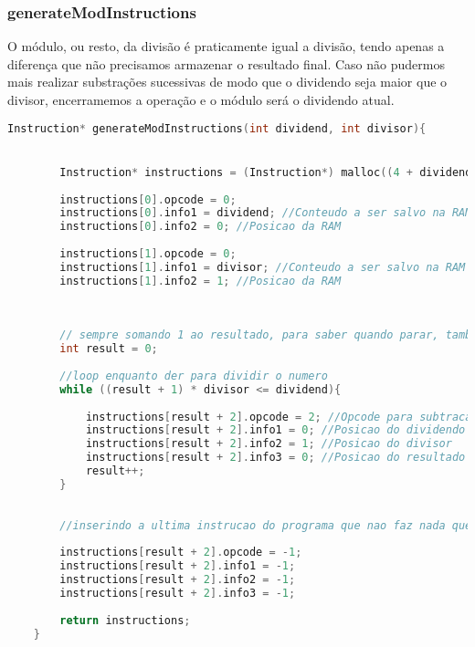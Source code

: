 \documentclass{article}
\begin{document}
\subsubsection{generateModInstructions}

O módulo, ou resto, da divisão é praticamente igual a divisão, tendo apenas a diferença que não precisamos armazenar o resultado final.
Caso não pudermos mais realizar substrações sucessivas de modo que o dividendo seja maior que o divisor, encerramemos a operação e o módulo será o dividendo atual.


\begin{lstlisting}[caption={Funçao generateModInstructions},label={lst:cod3},language=C]
    Instruction* generateModInstructions(int dividend, int divisor){


        Instruction* instructions = (Instruction*) malloc((4 + dividend/divisor) * sizeof(Instruction));
    
        instructions[0].opcode = 0;
        instructions[0].info1 = dividend; //Conteudo a ser salvo na RAM
        instructions[0].info2 = 0; //Posicao da RAM
        
        instructions[1].opcode = 0;
        instructions[1].info1 = divisor; //Conteudo a ser salvo na RAM
        instructions[1].info2 = 1; //Posicao da RAM
    
    
    
        // sempre somando 1 ao resultado, para saber quando parar, tambem serve como um indice para manter a contagem
        int result = 0;
    
        //loop enquanto der para dividir o numero
        while ((result + 1) * divisor <= dividend){
    
            instructions[result + 2].opcode = 2; //Opcode para subtracao
            instructions[result + 2].info1 = 0; //Posicao do dividendo
            instructions[result + 2].info2 = 1; //Posicao do divisor
            instructions[result + 2].info3 = 0; //Posicao do resultado da divisao
            result++;
        }
    
    
        //inserindo a ultima instrucao do programa que nao faz nada que presta
        
        instructions[result + 2].opcode = -1;
        instructions[result + 2].info1 = -1;
        instructions[result + 2].info2 = -1;
        instructions[result + 2].info3 = -1;
    
        return instructions;
    }
    
    
\end{lstlisting}
\clearpage
\end{document}
